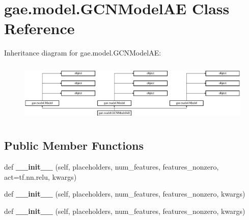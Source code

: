 \hypertarget{classgae_1_1model_1_1GCNModelAE}{}\section{gae.\+model.\+G\+C\+N\+Model\+AE Class Reference}
\label{classgae_1_1model_1_1GCNModelAE}
Inheritance diagram for gae.\+model.\+G\+C\+N\+Model\+AE\+:\begin{figure}[H]
\begin{center}
\leavevmode
\includegraphics[height=2.898551cm]{classgae_1_1model_1_1GCNModelAE}
\end{center}
\end{figure}
\subsection*{Public Member Functions}
\begin{DoxyCompactItemize}
\item 
\mbox{\label{classgae_1_1model_1_1GCNModelAE_a8daea11119489965c3f1c4af35a24d01}} 
def {\bfseries \+\_\+\+\_\+init\+\_\+\+\_\+} (self, placeholders, num\+\_\+features, features\+\_\+nonzero, act=tf.\+nn.\+relu, kwargs)
\item 
\mbox{\label{classgae_1_1model_1_1GCNModelAE_aeda41cc8cd994dda5de868fda6ac0909}} 
def {\bfseries \+\_\+\+\_\+init\+\_\+\+\_\+} (self, placeholders, num\+\_\+features, features\+\_\+nonzero, kwargs)
\item 
\mbox{\label{classgae_1_1model_1_1GCNModelAE_aeda41cc8cd994dda5de868fda6ac0909}} 
def {\bfseries \+\_\+\+\_\+init\+\_\+\+\_\+} (self, placeholders, num\+\_\+features, features\+\_\+nonzero, kwargs)
\end{DoxyCompactItemize}
